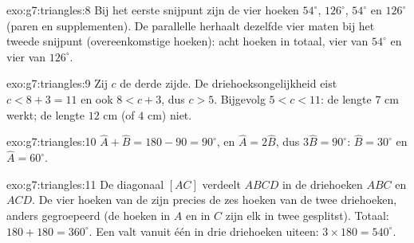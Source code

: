 \begin{solution}{exo:g7:triangles:8}
Bij het eerste snijpunt zijn de vier hoeken $54^\circ$, $126^\circ$, $54^\circ$ en
$126^\circ$ (paren  en supplementen). De parallelle  herhaalt
dezelfde vier maten bij het tweede snijpunt (overeenkomstige hoeken): acht hoeken in
totaal, vier van $54^\circ$ en vier van $126^\circ$.
\end{solution}

\begin{solution}{exo:g7:triangles:9}
Zij $c$ de derde zijde. De driehoeksongelijkheid eist $c < 8 + 3 = 11$ en ook
$8 < c + 3$, dus $c > 5$. Bijgevolg $5 < c < 11$: de lengte $7$ cm werkt; de lengte
$12$ cm (of $4$ cm) niet.
\end{solution}

\begin{solution}{exo:g7:triangles:10}
$\widehat A + \widehat B = 180 - 90 = 90^\circ$, en $\widehat A = 2\widehat B$, dus
$3\widehat B = 90^\circ$: $\widehat B = 30^\circ$ en $\widehat A = 60^\circ$.
\end{solution}

\begin{solution}{exo:g7:triangles:11}
De diagonaal $[AC]$ verdeelt $ABCD$ in de driehoeken $ABC$ en $ACD$. De vier hoeken
van de  zijn precies de zes hoeken van de twee driehoeken, anders gegroepeerd
(de hoeken in $A$ en in $C$ zijn elk in twee gesplitst). Totaal:
$180 + 180 = 360^\circ$. Een  valt vanuit één  in drie driehoeken
uiteen: $3 \times 180 = 540^\circ$.
\end{solution}

